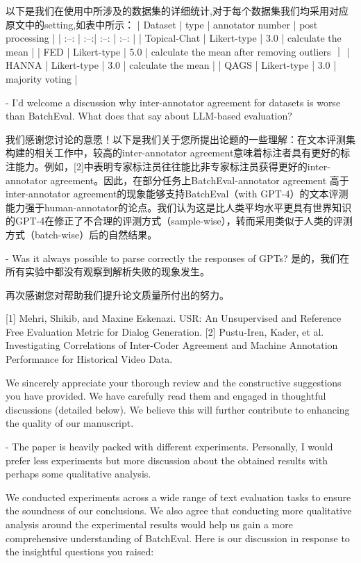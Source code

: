 以下是我们在使用中所涉及的数据集的详细统计,对于每个数据集我们均采用对应原文中的setting,如表中所示：
| Dataset      |  type | annotator number | post processing |
| :--: | :--:| :--: | :--: |
| Topical-Chat  | Likert-type | 3.0 | calculate the mean |
| FED     |   Likert-type |  5.0  | calculate the mean after removing outliers ｜
| HANNA      |    Likert-type | 3.0  | calculate the mean |
| QAGS      |    Likert-type | 3.0  | majority voting |


- I'd welcome a discussion why inter-annotator agreement for datasets is worse than BatchEval. What does that say about LLM-based evaluation?

我们感谢您讨论的意愿！以下是我们关于您所提出论题的一些理解：在文本评测集构建的相关工作中，较高的inter-annotator agreement意味着标注者具有更好的标注能力。例如，[2]中表明专家标注员往往能比非专家标注员获得更好的inter-annotator agreement。因此，在部分任务上BatchEval-annotator agreement 高于inter-annotator agreement的现象能够支持BatchEval（with GPT-4）的文本评测能力强于human-annotator的论点。我们认为这是比人类平均水平更具有世界知识的GPT-4在修正了不合理的评测方式（sample-wise），转而采用类似于人类的评测方式（batch-wise）后的自然结果。

- Was it always possible to parse correctly the responses of GPTs?
是的，我们在所有实验中都没有观察到解析失败的现象发生。

再次感谢您对帮助我们提升论文质量所付出的努力。

[1] Mehri, Shikib, and Maxine Eskenazi. USR: An Unsupervised and Reference Free Evaluation Metric for Dialog Generation.
[2] Pustu-Iren, Kader, et al. Investigating Correlations of Inter-Coder Agreement and Machine Annotation Performance for Historical Video Data.



We sincerely appreciate your thorough review and the constructive suggestions you have provided. We have carefully read them and engaged in thoughtful discussions (detailed below). We believe this will further contribute to enhancing the quality of our manuscript.

- The paper is heavily packed with different experiments. Personally, I would prefer less experiments but more discussion about the obtained results with perhaps some qualitative analysis.

We conducted experiments across a wide range of text evaluation tasks to ensure the soundness of our conclusions. We also agree that conducting more qualitative analysis around the experimental results would help us gain a more comprehensive understanding of BatchEval. Here is our discussion in response to the insightful questions you raised:

